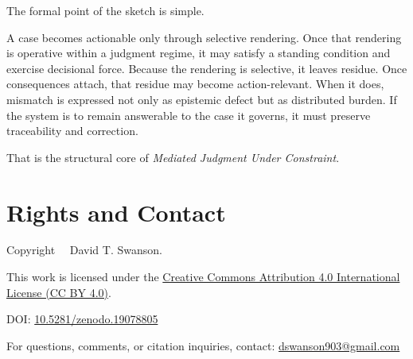 \documentclass[11pt]{article}
\renewcommand{\emph}[1]{\textit{#1}}
\begin{document}
The formal point of the sketch is simple.

A case becomes actionable only through selective rendering. Once that rendering is operative within a judgment regime, it may satisfy a standing condition and exercise decisional force. Because the rendering is selective, it leaves residue. Once consequences attach, that residue may become action-relevant. When it does, mismatch is expressed not only as epistemic defect but as distributed burden. If the system is to remain answerable to the case it governs, it must preserve traceability and correction.

That is the structural core of \emph{Mediated Judgment Under Constraint}.


\section*{Rights and Contact}

\noindent
Copyright \textcopyright\ \the\year\ David T. Swanson.

\noindent
This work is licensed under the
\href{https://creativecommons.org/licenses/by/4.0/}
{Creative Commons Attribution 4.0 International License (CC BY 4.0)}.

\noindent
DOI:
\href{https://doi.org/10.5281/zenodo.19078805}{10.5281/zenodo.19078805}

\noindent
For questions, comments, or citation inquiries, contact:
\href{mailto:dswanson903@gmail.com}{dswanson903@gmail.com}
\end{document}

